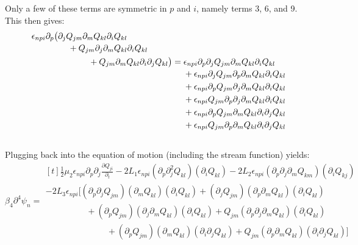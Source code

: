 \documentclass[reqno]{article}
\begin{document}
	Only a few of these terms are symmetric in $p$ and $i$, namely terms 3, 6, and 9.
	This then gives:
	\begin{equation}
	\begin{multlined}[b]
		\epsilon_{npi} \partial_p \bigl(
		\partial_j Q_{jm} \partial_m Q_{kl} \partial_i Q_{kl} \\
		\hspace{0.5cm}+ Q_{jm} \partial_j \partial_m Q_{kl} \partial_i Q_{kl} \\
		\hspace{2cm}+ Q_{jm} \partial_m Q_{kl} \partial_i \partial_j Q_{kl}
		\bigr)
	\end{multlined}
		= 
	\begin{multlined}[t]
	\epsilon_{npi} \partial_p \partial_j Q_{jm} \partial_m Q_{kl} \partial_i Q_{kl} \\
		+ \epsilon_{npi} \partial_j Q_{jm} \partial_p \partial_m Q_{kl} \partial_i Q_{kl} \\
		+ \epsilon_{npi} \partial_p Q_{jm} \partial_j \partial_m Q_{kl} \partial_i Q_{kl} \\
		+ \epsilon_{npi} Q_{jm} \partial_p \partial_j \partial_m Q_{kl} \partial_i Q_{kl} \\
		+ \epsilon_{npi} \partial_p Q_{jm} \partial_m Q_{kl} \partial_i \partial_j Q_{kl} \\
		+ \epsilon_{npi} Q_{jm} \partial_p \partial_m Q_{kl} \partial_i \partial_j Q_{kl} \\
	\end{multlined}
	\end{equation}
	Plugging back into the equation of motion (including the stream function) yields:
	\begin{equation}
		\beta_4 \partial^4 \psi_n
		=
	\begin{multlined}[t]
		\tfrac12 \mu_2 \epsilon_{npi} \partial_p \partial_j 
		\frac{\partial Q_{ji}}{\partial_t} 
		- 2 L_1 \epsilon_{npi} (\partial_p \partial_j^2 Q_{kl}) (\partial_i Q_{kl})
		- 2 L_2 \epsilon_{npi} (\partial_p \partial_j \partial_m Q_{km}) (\partial_i Q_{kj}) \\
		- 2 L_3 \epsilon_{npi} \biggl[
		(\partial_p \partial_j Q_{jm}) (\partial_m Q_{kl}) (\partial_i Q_{kl})
		+ (\partial_j Q_{jm}) (\partial_p \partial_m Q_{kl}) (\partial_i Q_{kl}) \\
		\hspace{2cm}+ (\partial_p Q_{jm}) (\partial_j \partial_m Q_{kl}) (\partial_i Q_{kl})
		+ Q_{jm} (\partial_p \partial_j \partial_m Q_{kl}) (\partial_i Q_{kl}) \\
		\hspace{3cm}+ (\partial_p Q_{jm}) (\partial_m Q_{kl}) (\partial_i \partial_j Q_{kl})
		+ Q_{jm} (\partial_p \partial_m Q_{kl}) (\partial_i \partial_j Q_{kl})
		\biggr]
	\end{multlined}
	\end{equation}
\end{document}
